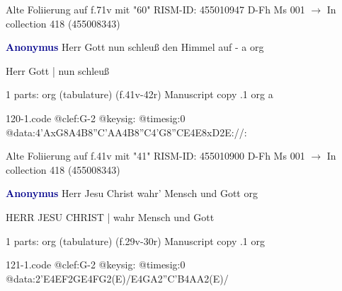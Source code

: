 \documentclass[twocolumn]{book}
\begin{document}
\newline Alte Foliierung auf f.71v mit "60"
\newline RISM-ID: 455010947
\newline D-Fh  Ms 001
\newline $\rightarrow$ In collection 418 (455008343)
      
\newline \par \vspace{7pt} \textcolor{darkblue}{\textbf{Anonymus  }}
\newline Herr Gott nun schleuß den Himmel auf - a
\newline org
\newline \begin{itshape}[f.41v, at left:] Herr Gott | nun schleuß\end{itshape} 
\newline \textcolor{darkblue}{}  1 parts: org (tabulature)  (f.41v-42r)
\newline Manuscript copy
.1  org  a  
\begin{filecontents*}{120-1.code}
@clef:G-2
@keysig:
@timesig:0
@data:4'AxG8A4B8''C{'AA}4B8''C4'G8''CE4E8xD2E://:
\end{filecontents*}
\newline
%

\newline Alte Foliierung auf f.41v mit "41"
\newline RISM-ID: 455010900
\newline D-Fh  Ms 001
\newline $\rightarrow$ In collection 418 (455008343)
      
\newline \par \vspace{7pt} \textcolor{darkblue}{\textbf{Anonymus  }}
\newline Herr Jesu Christ wahr' Mensch und Gott
\newline org
\newline \begin{itshape}[f.29v, at left:] HERR JESU CHRIST | wahr Mensch und Gott\end{itshape} 
\newline \textcolor{darkblue}{}  1 parts: org (tabulature)  (f.29v-30r)
\newline Manuscript copy
.1  org  
\begin{filecontents*}{121-1.code}
@clef:G-2
@keysig:
@timesig:0
@data:2'E4EF2GE4FG2(E)/E4GA2''C'B4AA2(E)/
\end{filecontents*}
\newline
%
\end{document}
